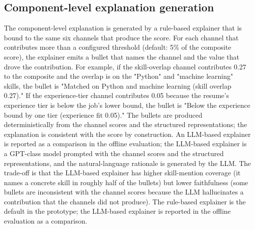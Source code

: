 \subsection{Component-level explanation generation}\label{sec:3.6}
The component-level explanation is generated by a rule-based explainer that is bound to the same six channels that produce the score.
For each channel that contributes more than a configured threshold (default: 5\% of the composite score), the explainer emits a bullet that names the channel and the value that drove the contribution.
For example, if the skill-overlap channel contributes 0.27 to the composite and the overlap is on the "Python" and "machine learning" skills, the bullet is "Matched on Python and machine learning (skill overlap 0.27)."
If the experience-tier channel contributes 0.05 because the resume's experience tier is below the job's lower bound, the bullet is "Below the experience bound by one tier (experience fit 0.05)."
The bullets are produced deterministically from the channel scores and the structured representations; the explanation is consistent with the score by construction.
An LLM-based explainer is reported as a comparison in the offline evaluation; the LLM-based explainer is a GPT-class model prompted with the channel scores and the structured representations, and the natural-language rationale is generated by the LLM.
The trade-off is that the LLM-based explainer has higher skill-mention coverage (it names a concrete skill in roughly half of the bullets) but lower faithfulness (some bullets are inconsistent with the channel scores because the LLM hallucinates a contribution that the channels did not produce).
The rule-based explainer is the default in the prototype; the LLM-based explainer is reported in the offline evaluation as a comparison.

